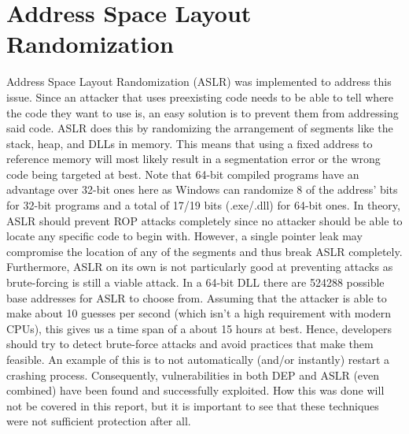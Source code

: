 \documentclass[10pt,twocolumn,a4paper]{article}
\begin{document}
\section{Address Space Layout Randomization}\label{sec:ASLR}
Address Space Layout Randomization (ASLR) was implemented to address this issue.
Since an attacker that uses preexisting code needs to be able to tell where the code they want to use is, an easy solution is to prevent them from addressing said code.
ASLR does this by randomizing the arrangement of segments like the stack, heap, and DLLs in memory\cite{ASLR}. This means that using a fixed address to reference memory will most likely result in a segmentation error or the wrong code being targeted at best. Note that 64-bit compiled programs have an advantage over 32-bit ones here as Windows can randomize 8 of the address' bits for 32-bit programs and a total of 17/19 bits (.exe/.dll) for 64-bit ones.\cite{ASLRBits}
In theory, ASLR should prevent ROP attacks completely since no attacker should be able to locate any specific code to begin with.
However, a single pointer leak may compromise the location of any of the segments and thus break ASLR completely.
Furthermore, ASLR on its own is not particularly good at preventing attacks as brute-forcing is still a viable attack. In a 64-bit DLL there are  524288 possible base addresses for ASLR to choose from. Assuming that the attacker is able to make about 10 guesses per second (which isn't a high requirement with modern CPUs), this gives us a time span of a about 15 hours at best.
Hence, developers should try to detect brute-force attacks and avoid practices that make them feasible. An example of this is to not automatically (and/or instantly) restart a crashing process\cite{ASLRBits}.
Consequently, vulnerabilities in both DEP and ASLR (even combined) have been found and successfully exploited\cite{bypass}.
How this was done will not be covered in this report, but it is important to see that these techniques were not sufficient protection after all.
\end{document}
